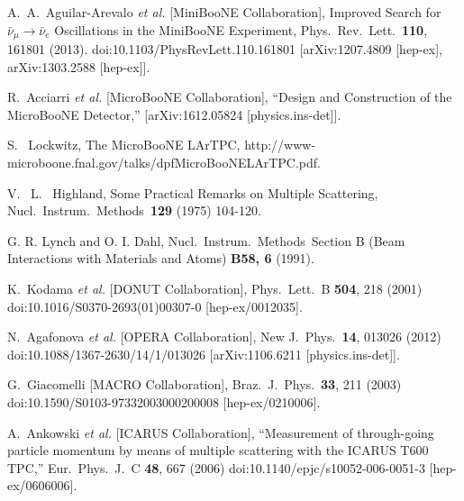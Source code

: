 \begin{thebibliography}{1}

  A.~A.~Aguilar-Arevalo {\it et al.} 
  [MiniBooNE Collaboration],
  Improved Search for $\bar \nu_\mu \rightarrow \bar \nu_e$ Oscillations in the MiniBooNE Experiment,
  Phys.\ Rev.\ Lett.\  {\bf 110}, 161801 (2013).
  doi:10.1103/PhysRevLett.110.161801
  [arXiv:1207.4809 [hep-ex], arXiv:1303.2588 [hep-ex]].

  R.~Acciarri {\it et al.} [MicroBooNE Collaboration],
  ``Design and Construction of the MicroBooNE Detector,''
  [arXiv:1612.05824 [physics.ins-det]].

  S. ~Lockwitz, 
  The MicroBooNE LArTPC,
  http://www-microboone.fnal.gov/talks/dpfMicroBooNELArTPC.pdf.

  V. ~L. ~Highland, 
  Some Practical Remarks on Multiple Scattering, 
  Nucl.\ Instrum.\ Methods\ {\bf 129} (1975)
  104-120.

  G. R. Lynch and O. I. Dahl, Nucl.\ Instrum.\ Methods\, 
  Section B (Beam Interactions with Materials and Atoms) {\bf B58, 6} (1991). 


  K.~Kodama {\it et al.} [DONUT Collaboration],
  Phys.\ Lett.\ B {\bf 504}, 218 (2001)
  doi:10.1016/S0370-2693(01)00307-0
  [hep-ex/0012035].

  N.~Agafonova {\it et al.} [OPERA Collaboration],
  New J.\ Phys.\  {\bf 14}, 013026 (2012)
  doi:10.1088/1367-2630/14/1/013026
  [arXiv:1106.6211 [physics.ins-det]].

 
  G.~Giacomelli [MACRO Collaboration],
  Braz.\ J.\ Phys.\  {\bf 33}, 211 (2003)
  doi:10.1590/S0103-97332003000200008
  [hep-ex/0210006].


  A.~Ankowski {\it et al.} [ICARUS Collaboration],
  ``Measurement of through-going particle momentum by means of multiple scattering with the ICARUS T600 TPC,''
  Eur.\ Phys.\ J.\ C {\bf 48}, 667 (2006)
  doi:10.1140/epjc/s10052-006-0051-3
  [hep-ex/0606006].


\end{thebibliography}
